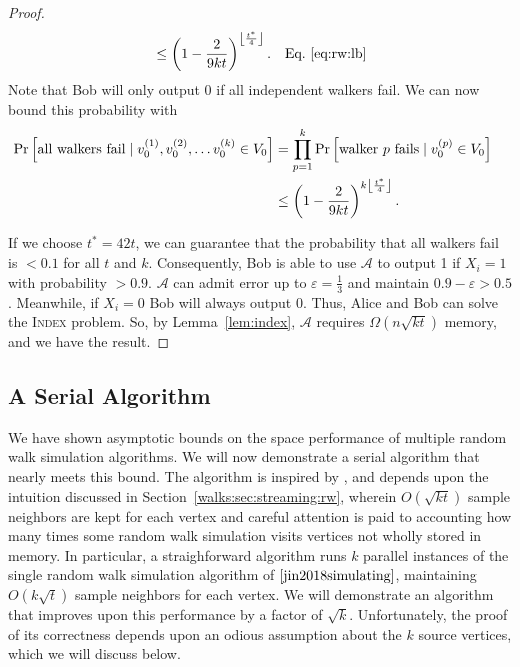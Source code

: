 \documentclass{report}
\newcommand{\algoname}[1]{\textnormal{\textsc{#1}}}
\begin{document}
\begin{proof}
\begin{align*}
&\leq
\left ( 1 - \frac{2}{9kt} \right ) ^ {\left \lfloor \frac{t^*}{4} \right \rfloor}.
& \textnormal{Eq.~\eqref{eq:rw:lb}}
\end{align*}
%
Note that Bob will only output 0 if all independent walkers fail. 
We can now bound this probability with 
%
\begin{align*}
\Pr \left [ \textnormal{all walkers fail} \mid v_0^{(1)}, v_0^{(2)}, \dots v_0^{(k)} \in V_0 \right ]
&=
\prod\limits_{p=1}^{k} \Pr \left [ \textnormal{walker $p$ fails} \mid v_0^{(p)} \in V_0 \right ]
&
\\
&\leq
\left ( 1 - \frac{2}{9kt} \right ) ^ {k\left \lfloor \frac{t^*}{4} \right \rfloor}.
&
\end{align*}
%

If we choose $t^* = 42 t$, we can guarantee that the probability that all walkers fail is $< 0.1$ for all $t$ and $k$. 
Consequently, Bob is able to use $\mathcal{A}$ to output 1 if $X_i = 1$ with probability $> 0.9$. 
$\mathcal{A}$ can admit error up to $\varepsilon = \frac{1}{3}$ and maintain $0.9 - \varepsilon > 0.5$.
Meanwhile, if $X_i = 0$ Bob will always output $0$.
Thus, Alice and Bob can solve the \algoname{Index} problem.
So, by Lemma~\ref{lem:index}, $\mathcal{A}$ requires $\Omega(n\sqrt{kt})$ memory, and we have the result.
\end{proof}


\subsection{A Serial Algorithm}
 \label{walks:sec:walks:serial}



We have shown asymptotic bounds on the space performance of multiple random walk simulation algorithms.
We will now demonstrate a serial algorithm that nearly meets this bound.
The algorithm is inspired by \cite{jin2018simulating}, and depends upon the intuition discussed in Section~\ref{walks:sec:streaming:rw}, wherein $O(\sqrt{kt})$ sample neighbors are kept for each vertex and careful attention is paid to accounting how many times some random walk simulation visits vertices not wholly stored in memory.
In particular, a straighforward algorithm runs $k$ parallel instances of the single random walk simulation algorithm of $\cite{jin2018simulating}$, maintaining $O(k\sqrt{t})$ sample neighbors for each vertex.
We will demonstrate an algorithm that improves upon this performance by a factor of $\sqrt{k}$.
Unfortunately, the proof of its correctness depends upon an odious assumption about the $k$ source vertices, which we will discuss below.
\end{document}
